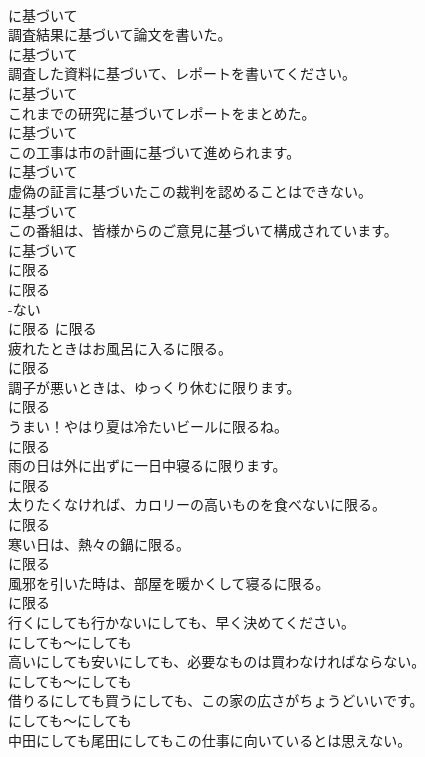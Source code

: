 \documentclass[8pt]{extreport}
\begin{document}
\begin{CJK}{UTF8}{min}
\\	に基づいて
\\	調査結果に基づいて論文を書いた。	
\\	に基づいて
\\	調査した資料に基づいて、レポートを書いてください。	
\\	に基づいて
\\	これまでの研究に基づいてレポートをまとめた。	
\\	に基づいて
\\	この工事は市の計画に基づいて進められます。	
\\	に基づいて
\\	虚偽の証言に基づいたこの裁判を認めることはできない。	
\\	に基づいて
\\	この番組は、皆様からのご意見に基づいて構成されています。	
\\	に基づいて
\\	に限る	
\\	に限る	
\\	-ない
\\	に限る	に限る
\\	疲れたときはお風呂に入るに限る。	
\\	に限る
\\	調子が悪いときは、ゆっくり休むに限ります。	
\\	に限る
\\	うまい！やはり夏は冷たいビールに限るね。	
\\	に限る
\\	雨の日は外に出ずに一日中寝るに限ります。	
\\	に限る
\\	太りたくなければ、カロリーの高いものを食べないに限る。	
\\	に限る
\\	寒い日は、熱々の鍋に限る。	
\\	に限る
\\	風邪を引いた時は、部屋を暖かくして寝るに限る。	
\\	に限る
\\	行くにしても行かないにしても、早く決めてください。	
\\	にしても～にしても
\\	高いにしても安いにしても、必要なものは買わなければならない。	
\\	にしても～にしても
\\	借りるにしても買うにしても、この家の広さがちょうどいいです。	
\\	にしても～にしても
\\	中田にしても尾田にしてもこの仕事に向いているとは思えない。	

\end{CJK}
\end{document}
